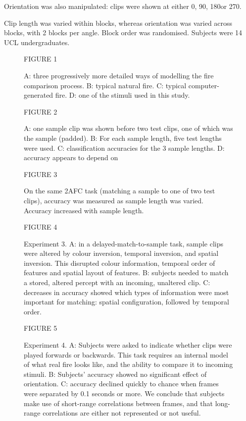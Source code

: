 \documentclass[a4paper]{article}
\begin{document}
Orientation was also manipulated: clips were shown at either 0\degree, 90\degree, 180\degree or 270\degree. 

Clip length was varied within blocks, whereas orientation was varied across blocks, with 2 blocks per angle.  Block order was randomised. Subjects were 14 UCL undergraduates.



  \begin{figure}[!ht]
\centering
  FIGURE 1
    \caption{A: three progressively more detailed ways of modelling the fire comparison process. B: typical natural fire. C: typical computer-generated fire. D: one of the stimuli used in this study.}
    \label{f1}
  \end{figure}

  \begin{figure}[!ht]
\centering
  FIGURE 2
    \caption{A: one sample clip was shown before two test clips, one of which was the sample (padded). B: For each sample length, five test lengths were used. C: classification accuracies for the 3 sample lengths. D: accuracy appears to depend on }
    \label{f2}
  \end{figure}

  \begin{figure}[!ht]
\centering
  FIGURE 3
    \caption{On the same 2AFC task (matching a sample to one of two test clips), accuracy was measured as sample length was varied. Accuracy increased with sample length.}
    \label{f1}
  \end{figure}

  \begin{figure}[!ht]
\centering
  FIGURE 4
    \caption{Experiment 3. A: in a delayed-match-to-sample task, sample clips were altered by colour inversion, temporal inversion, and spatial inversion. This disrupted colour information, temporal order of features and spatial layout of features. B: subjects needed to match a stored, altered percept with an incoming, unaltered clip. C: decreases in accuracy showed which types of information were most important for matching: spatial configuration, followed by temporal order.}
    \label{f4}
  \end{figure}

  \begin{figure}[!ht]
\centering
  FIGURE 5
    \caption{Experiment 4. A: Subjects were asked to indicate whether clips were played forwards or backwards. This task requires an internal model of what real fire looks like, and the ability to compare it to incoming stimuli. B: Subjects' accuracy showed no significant effect of orientation. C: accuracy declined quickly to chance when frames were separated by 0.1 seconds or more. We conclude that subjects make use of short-range correlations between frames, and that long-range correlations are either not represented or not useful.}
    \label{f5}
  \end{figure}


\begin{singlespace}
\begin{footnotesize}
\begin{twocolumn}


\end{twocolumn}
\end{footnotesize}




\end{singlespace}
\newpage
\end{document}
